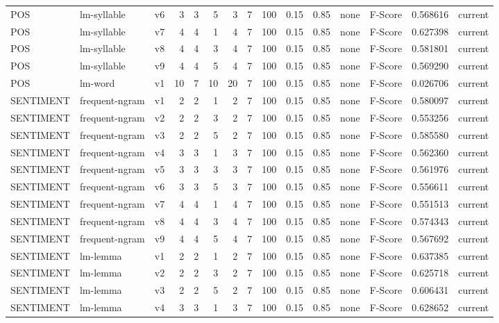 \documentclass{article}
\begin{document}
\begin{xltabular}{\linewidth}{@{}lYcrrrrrrrrYlrl@{}}
POS & lm-syllable & v6 & 3 & 3 & 5 & 3 & 7 & 100 & 0.15 & 0.85 & none & F-Score & 0.568616 & current \\
POS & lm-syllable & v7 & 4 & 4 & 1 & 4 & 7 & 100 & 0.15 & 0.85 & none & F-Score & 0.627398 & current \\
POS & lm-syllable & v8 & 4 & 4 & 3 & 4 & 7 & 100 & 0.15 & 0.85 & none & F-Score & 0.581801 & current \\
POS & lm-syllable & v9 & 4 & 4 & 5 & 4 & 7 & 100 & 0.15 & 0.85 & none & F-Score & 0.569290 & current \\
POS & lm-word & v1 & 10 & 7 & 10 & 20 & 7 & 100 & 0.15 & 0.85 & none & F-Score & 0.026706 & current \\
SENTIMENT & frequent-ngram & v1 & 2 & 2 & 1 & 2 & 7 & 100 & 0.15 & 0.85 & none & F-Score & 0.580097 & current \\
SENTIMENT & frequent-ngram & v2 & 2 & 2 & 3 & 2 & 7 & 100 & 0.15 & 0.85 & none & F-Score & 0.553256 & current \\
SENTIMENT & frequent-ngram & v3 & 2 & 2 & 5 & 2 & 7 & 100 & 0.15 & 0.85 & none & F-Score & 0.585580 & current \\
SENTIMENT & frequent-ngram & v4 & 3 & 3 & 1 & 3 & 7 & 100 & 0.15 & 0.85 & none & F-Score & 0.562360 & current \\
SENTIMENT & frequent-ngram & v5 & 3 & 3 & 3 & 3 & 7 & 100 & 0.15 & 0.85 & none & F-Score & 0.561976 & current \\
SENTIMENT & frequent-ngram & v6 & 3 & 3 & 5 & 3 & 7 & 100 & 0.15 & 0.85 & none & F-Score & 0.556611 & current \\
SENTIMENT & frequent-ngram & v7 & 4 & 4 & 1 & 4 & 7 & 100 & 0.15 & 0.85 & none & F-Score & 0.551513 & current \\
SENTIMENT & frequent-ngram & v8 & 4 & 4 & 3 & 4 & 7 & 100 & 0.15 & 0.85 & none & F-Score & 0.574343 & current \\
SENTIMENT & frequent-ngram & v9 & 4 & 4 & 5 & 4 & 7 & 100 & 0.15 & 0.85 & none & F-Score & 0.567692 & current \\
SENTIMENT & lm-lemma & v1 & 2 & 2 & 1 & 2 & 7 & 100 & 0.15 & 0.85 & none & F-Score & 0.637385 & current \\
SENTIMENT & lm-lemma & v2 & 2 & 2 & 3 & 2 & 7 & 100 & 0.15 & 0.85 & none & F-Score & 0.625718 & current \\
SENTIMENT & lm-lemma & v3 & 2 & 2 & 5 & 2 & 7 & 100 & 0.15 & 0.85 & none & F-Score & 0.606431 & current \\
SENTIMENT & lm-lemma & v4 & 3 & 3 & 1 & 3 & 7 & 100 & 0.15 & 0.85 & none & F-Score & 0.628652 & current \\

\end{xltabular}
\end{document}
